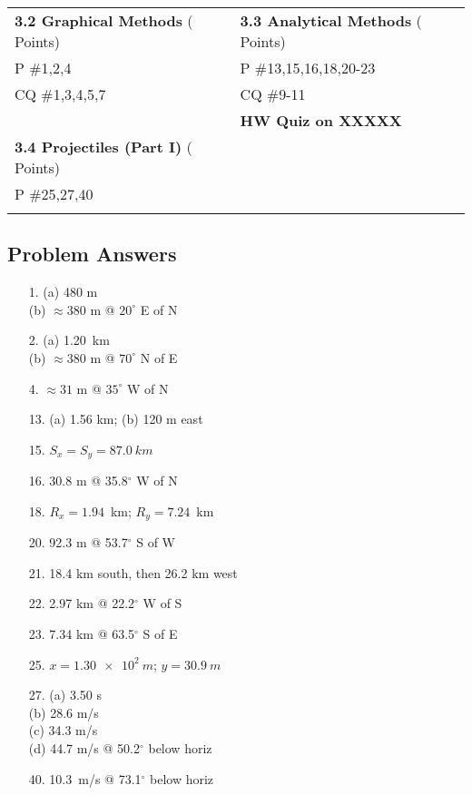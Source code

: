 \documentclass[10pt]{exam}
\newcommand{\bs}[2]{\textbf{#1} (\sc #2 Points)}
\begin{document}
\vspace{1em}


\begin{tabular}{|*{2}{p{7cm}|}}
  \hline
  \bs{3.2 Graphical Methods}{3}  & \bs{3.3 Analytical Methods}{8}  \\
  P \#1,2,4                      &  P \#13,15,16,18,20-23           \\
  CQ \#1,3,4,5,7                 &  CQ \#9-11                       \\
                                 & \textbf{HW Quiz on XXXXX}\\[2.5cm]\hline
  \bs{3.4 Projectiles (Part I)}{4}  \\
  P \#25,27,40                      \\
                                    \\[2.5cm]\cline{1-1}

\end{tabular}


  


\subsection*{Problem Answers}

\begin{multicols}{3}

  \begin{itemize}[noitemsep]
    \item[1. ] (a) 480 m \\ 
               (b) $\approx 380$ m @ $20^\circ$ E of N
    \item[2. ] (a) 1.20~km \\
               (b) $\approx 380$ m @ $70^\circ$ N of E 
    \item[4. ] $\approx 31$ m @ $35^\circ$ W of N
    \item[13.] (a) 1.56 km; (b) 120 m east
    \item[15.] $S_x=S_y=\SI{87.0}{km}$
    \item[16.] 30.8 m @ 35.8$^\circ$ W of N
    \item[18.] $R_x = 1.94$~km; $R_y = 7.24$~km
    \item[20.] 92.3 m @ 53.7$^\circ$ S of W
    \item[21.] 18.4 km south, then 26.2 km west
    \item[22.] 2.97 km @ 22.2$^\circ$ W of S
    \item[23.] 7.34 km @ 63.5$^\circ$ S of E
    \item[25.] $x=\SI{1.30e2}{m}$; $y=\SI{30.9}{m}$
    \item[27.] (a) 3.50 s \\
               (b) 28.6 m/s \\
               (c) 34.3 m/s \\
               (d) 44.7 m/s @ 50.2$^\circ$ below horiz
  \item[40.] 10.3~m/s @ 73.1$^\circ$ below horiz
    
  \end{itemize}
  
\end{multicols}
\end{document}
